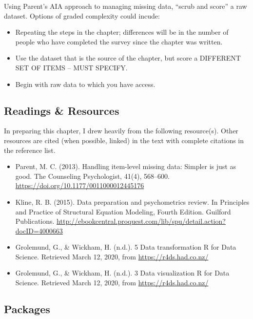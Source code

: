 \documentclass[
  english,
]{book}
\providecommand{\tightlist}{%
  \setlength{\itemsep}{0pt}\setlength{\parskip}{0pt}}
\begin{document}
Using Parent's \citeyearpar{parent_handling_2013} AIA approach to managing missing data, ``scrub and score'' a raw dataset. Options of graded complexity could incude:

\begin{itemize}
\tightlist
\item
  Repeating the steps in the chapter; differences will be in the number of people who have completed the survey since the chapter was written.
\item
  Use the dataset that is the source of the chapter, but score a DIFFERENT SET OF ITEMS -- MUST SPECIFY.
\item
  Begin with raw data to which you have access.
\end{itemize}

\hypertarget{readings-resources-1}{%
\subsection{Readings \& Resources}\label{readings-resources-1}}

In preparing this chapter, I drew heavily from the following resource(s). Other resources are cited (when possible, linked) in the text with complete citations in the reference list.

\begin{itemize}
\item
  Parent, M. C. (2013). Handling item-level missing data: Simpler is just as good. The Counseling Psychologist, 41(4), 568--600. \url{https://doi.org/10.1177/0011000012445176}
\item
  Kline, R. B. (2015). Data preparation and psychometrics review. In Principles and Practice of Structural Equation Modeling, Fourth Edition. Guilford Publications. \url{http://ebookcentral.proquest.com/lib/spu/detail.action?docID=4000663}
\item
  Grolemund, G., \& Wickham, H. (n.d.). 5 Data transformation \textbar{} R for Data Science. Retrieved March 12, 2020, from \url{https://r4ds.had.co.nz/}
\item
  Grolemund, G., \& Wickham, H. (n.d.). 3 Data visualization \textbar{} R for Data Science. Retrieved March 12, 2020, from \url{https://r4ds.had.co.nz/}
\end{itemize}

\hypertarget{packages-1}{%
\subsection{Packages}\label{packages-1}}
\end{document}
